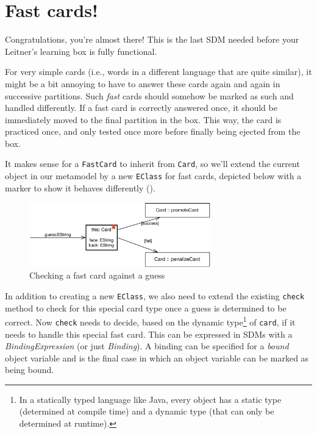 \newpage
\section{Fast cards!}
\genHeader
\hypertarget{sec:fastCard}{}

Congratulations, you're almost there! This is the last SDM needed before your Leitner's learning box is fully functional.

For very simple cards (i.e., words in a different language that are quite similar), it might be a bit annoying to have to answer these cards again and
again in successive partitions. Such \emph{fast} cards should somehow be marked as such and handled differently. If a fast card is correctly answered once,
it should be immediately moved to the final partition in the box. This way, the card is practiced once, and only tested once more before finally being ejected from the
box.

It makes sense for a \texttt{FastCard} to inherit from \texttt{Card}, so we'll extend the current object in our metamodel by a new \texttt{EClass} for fast cards, 
depicted below with a marker to show it behaves differently ().

\begin{figure}[htbp]
	\centering
    \includegraphics[width=0.7\textwidth]{goal_fastCard}
	\caption{Checking a fast card against a guess}
	\label{fig:goal_fastCard}
\end{figure}
\FloatBarrier

In addition to creating a new \texttt{EClass}, we also need to extend the
existing \texttt{check} method to check for this special card type once a guess is determined to be correct. Now \texttt{check} needs to decide, based on the dynamic type\footnote{In a statically typed language like Java, every
object has a static type (determined at compile time) and a dynamic type (that can only be determined at runtime).} of \texttt{card}, if it needs to handle this special fast card. This
can be expressed in SDMs with a \emph{BindingExpression} (or just \emph{Binding}). A binding can be specified for a \emph{bound} object variable
and is the final case in which an object variable can be marked as being bound.

